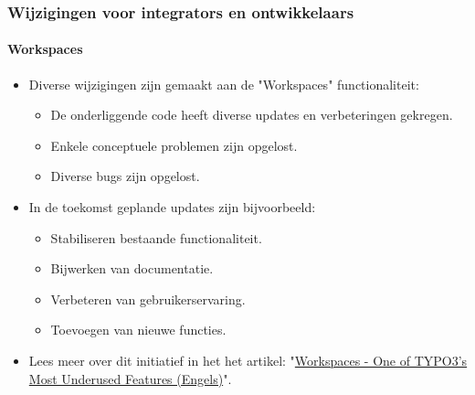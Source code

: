 %

\begin{frame}[fragile]
	\frametitle{Wijzigingen voor integrators en ontwikkelaars}
	\framesubtitle{Workspaces}

	\begin{itemize}
		\item Diverse wijzigingen zijn gemaakt aan de "Workspaces" functionaliteit:

			\begin{itemize}
				\item De onderliggende code heeft diverse updates en verbeteringen gekregen.
				\item Enkele conceptuele problemen zijn opgelost.
				\item Diverse bugs zijn opgelost.
			\end{itemize}

		\item In de toekomst geplande updates zijn bijvoorbeeld:

			\begin{itemize}
				\item Stabiliseren bestaande functionaliteit.
				\item Bijwerken van documentatie.
				\item Verbeteren van gebruikerservaring.
				\item Toevoegen van nieuwe functies.
			\end{itemize}

		\item Lees meer over dit initiatief in het het artikel:\newline
			"\href{https://typo3.org/article/workspaces-one-of-typo3s-most-underused-features}{Workspaces - One of TYPO3's Most Underused Features (Engels)}".

	\end{itemize}

\end{frame}

